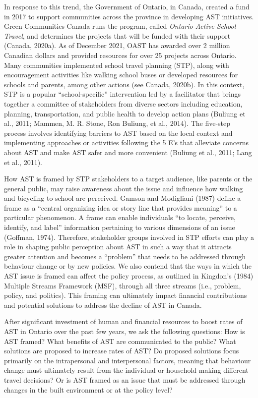 \documentclass[]{elsarticle} %
\begin{document}
In response to this trend, the Government of Ontario, in Canada, created
a fund in 2017 to support communities across the province in developing
AST initiatives. Green Communities Canada runs the program, called
\emph{Ontario Active School Travel}, and determines the projects that
will be funded with their support (Canada, 2020a). As of December 2021,
OAST has awarded over 2 million Canadian dollars and provided resources
for over 25 projects across Ontario. Many communities implemented school
travel planning (STP), along with encouragement activities like walking
school buses or developed resources for schools and parents, among other
actions (see Canada, 2020b). In this context, STP is a popular
``school-specific'' intervention led by a facilitator that brings
together a committee of stakeholders from diverse sectors including
education, planning, transportation, and public health to develop action
plans (Buliung et al., 2011; Mammen, M. R. Stone, Ron Buliung, et al.,
2014). The five-step process involves identifying barriers to AST based
on the local context and implementing approaches or activities following
the 5 E's that alleviate concerns about AST and make AST safer and more
convenient (Buliung et al., 2011; Lang et al., 2011).

How AST is framed by STP stakeholders to a target audience, like parents
or the general public, may raise awareness about the issue and influence
how walking and bicycling to school are perceived. Gamson and Modigliani
(1987) define a frame as a ``central organizing idea or story line that
provides meaning'' to a particular phenomenon. A frame can enable
individuals ``to locate, perceive, identify, and label'' information
pertaining to various dimensions of an issue (Goffman, 1974). Therefore,
stakeholder groups involved in STP efforts can play a role in shaping
public perception about AST in such a way that it attracts greater
attention and becomes a ``problem'' that needs to be addressed through
behaviour change or by new policies. We also contend that the ways in
which the AST issue is framed can affect the policy process, as outlined
in Kingdon's (1984) Multiple Streams Framework (MSF), through all three
streams (i.e., problem, policy, and politics). This framing can
ultimately impact financial contributions and potential solutions to
address the decline of AST in Canada.

After significant investment of human and financial resources to boost
rates of AST in Ontario over the past few years, we ask the following
questions: How is AST framed? What benefits of AST are communicated to
the public? What solutions are proposed to increase rates of AST? Do
proposed solutions focus primarily on the intrapersonal and
interpersonal factors, meaning that behaviour change must ultimately
result from the individual or household making different travel
decisions? Or is AST framed as an issue that must be addressed through
changes in the built environment or at the policy level?
\end{document}
